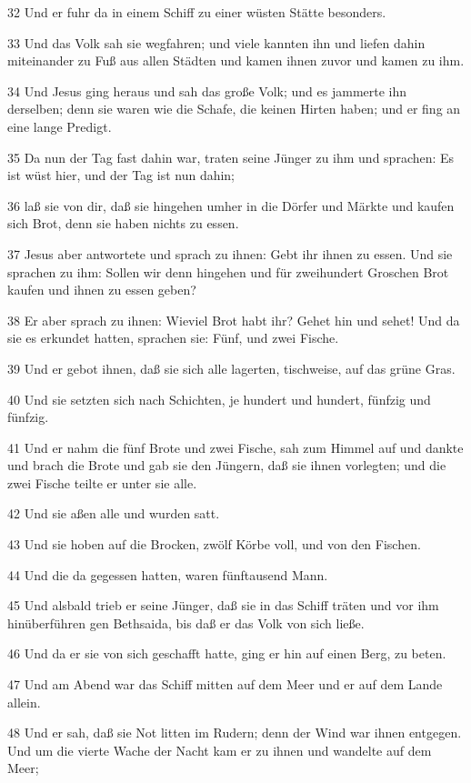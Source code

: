 \par 32 Und er fuhr da in einem Schiff zu einer wüsten Stätte besonders.
\par 33 Und das Volk sah sie wegfahren; und viele kannten ihn und liefen dahin miteinander zu Fuß aus allen Städten und kamen ihnen zuvor und kamen zu ihm.
\par 34 Und Jesus ging heraus und sah das große Volk; und es jammerte ihn derselben; denn sie waren wie die Schafe, die keinen Hirten haben; und er fing an eine lange Predigt.
\par 35 Da nun der Tag fast dahin war, traten seine Jünger zu ihm und sprachen: Es ist wüst hier, und der Tag ist nun dahin;
\par 36 laß sie von dir, daß sie hingehen umher in die Dörfer und Märkte und kaufen sich Brot, denn sie haben nichts zu essen.
\par 37 Jesus aber antwortete und sprach zu ihnen: Gebt ihr ihnen zu essen. Und sie sprachen zu ihm: Sollen wir denn hingehen und für zweihundert Groschen Brot kaufen und ihnen zu essen geben?
\par 38 Er aber sprach zu ihnen: Wieviel Brot habt ihr? Gehet hin und sehet! Und da sie es erkundet hatten, sprachen sie: Fünf, und zwei Fische.
\par 39 Und er gebot ihnen, daß sie sich alle lagerten, tischweise, auf das grüne Gras.
\par 40 Und sie setzten sich nach Schichten, je hundert und hundert, fünfzig und fünfzig.
\par 41 Und er nahm die fünf Brote und zwei Fische, sah zum Himmel auf und dankte und brach die Brote und gab sie den Jüngern, daß sie ihnen vorlegten; und die zwei Fische teilte er unter sie alle.
\par 42 Und sie aßen alle und wurden satt.
\par 43 Und sie hoben auf die Brocken, zwölf Körbe voll, und von den Fischen.
\par 44 Und die da gegessen hatten, waren fünftausend Mann.
\par 45 Und alsbald trieb er seine Jünger, daß sie in das Schiff träten und vor ihm hinüberführen gen Bethsaida, bis daß er das Volk von sich ließe.
\par 46 Und da er sie von sich geschafft hatte, ging er hin auf einen Berg, zu beten.
\par 47 Und am Abend war das Schiff mitten auf dem Meer und er auf dem Lande allein.
\par 48 Und er sah, daß sie Not litten im Rudern; denn der Wind war ihnen entgegen. Und um die vierte Wache der Nacht kam er zu ihnen und wandelte auf dem Meer;
